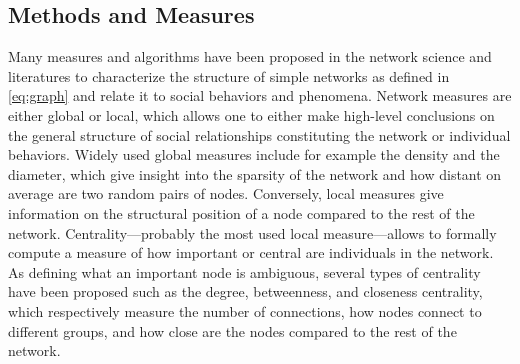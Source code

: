 \subsection{Methods and Measures}\label{subsec:methods-and-measures}


Many measures and algorithms have been proposed in the network science and \sna literatures to characterize the structure of simple networks as defined in \autoref{eq:graph} and relate it to social behaviors and phenomena\cite{scottSocialNetworkAnalysis1988, tabassumSocialNetworkAnalysis2018}.
Network measures are either global or local, which allows one to either make high-level conclusions on the general structure of social relationships constituting the network or individual behaviors.
Widely used global measures include for example the density and the diameter, which give insight into the sparsity of the network and how distant on average are two random pairs of nodes.
Conversely, local measures give information on the structural position of a node compared to the rest of the network.
Centrality---probably the most used local measure---allows to formally compute a measure of how important or central are individuals in the network\cite{newmanNetworks2018}.
As defining what an important node is ambiguous, several types of centrality have been proposed such as the degree, betweenness, and closeness centrality, which respectively measure the number of connections, how nodes connect to different groups, and how close are the nodes compared to the rest of the network.

